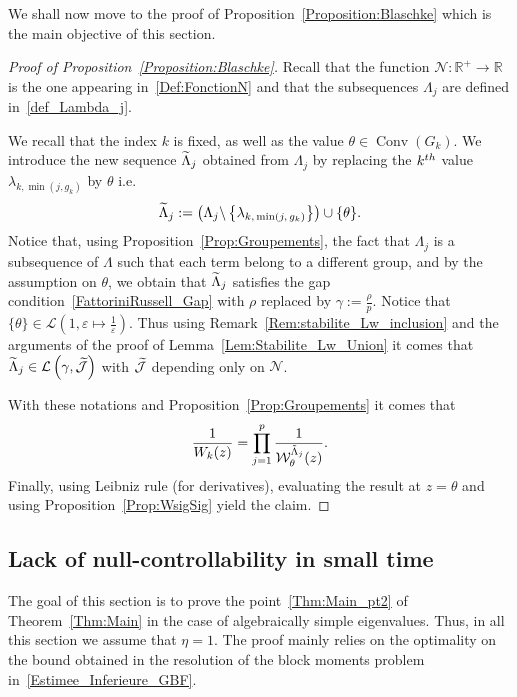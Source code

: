 \documentclass[11pt]{article}
\theoremstyle{definition}
\numberwithin{equation}{section}
\numberwithin{figure}{section}
\numberwithin{table}{section}
\DeclareMathOperator{\Conv}{Conv}
\newcommand{\n}{g}
\newcommand{\LL}{\mathcal{L}}
\newcommand{\R}{\mathbb{R}}
\let\oldtilde\tilde
\renewcommand*{\tilde}[1]{\mathchoice{\widetilde{#1}}{\widetilde{#1}}{\oldtilde{#1}}{\oldtilde{#1}}}\let\oldexists\exists
\renewcommand*{\exists}{\mathrel{\oldexists}}
\begin{document}
We shall now move to the proof of Proposition~\ref{Proposition:Blaschke} which is the main objective of this section.
\begin{proof}[Proof of Proposition~\ref{Proposition:Blaschke}]
Recall that the function $\mathcal{N} : \R^+ \to \R$ is the one appearing in~\eqref{Def:FonctionN} and that the subsequences $\Lambda_j$ are defined in~\eqref{def_Lambda_j}.

We recall that the index $k$ is fixed, as well as the value $\theta\in \Conv(G_k)$. We introduce the new sequence $\tilde{\Lambda}_j$ obtained from $\Lambda_j$ by replacing the $k^{\rm th}$ value $\lambda_{k,\min(j,\n_k)}$ by $\theta$ i.e.
\[
\tilde{\Lambda}_j := \left(\Lambda_j \backslash \left\{ \lambda_{k,\,\min(j,\,\n_k)} \right\} \right) \cup \{ \theta \}.
\]
Notice that, using Proposition~\ref{Prop:Groupements}, the fact that $\Lambda_j$ is a subsequence of $\Lambda$ such that each term belong to a different group, and by the assumption on $\theta$, we obtain that $\tilde{\Lambda}_j$ satisfies the gap condition~\eqref{FattoriniRussell_Gap} with $\rho$ replaced by $\gamma:=\frac{\rho}{p}$. Notice that $\{ \theta \} \in \LL \left(1, \varepsilon \mapsto \frac{1}{\varepsilon} \right)$. Thus using Remark~\ref{Rem:stabilite_Lw_inclusion} and the arguments of the proof of Lemma~\ref{Lem:Stabilite_Lw_Union} it comes that $\tilde{\Lambda}_j \in \mathcal{L}\left(\gamma,\tilde{\mathcal{J}}\right)$ with $\tilde{\mathcal{J}}$ depending only on $\mathcal{N}$.


With these notations and Proposition~\ref{Prop:Groupements} it comes that
\[
\frac{1}{W_k(z)} = \prod_{j=1}^p \frac{1}{\mathcal{W}^{\tilde{\Lambda}_j}_{\theta} (z)}.
\]
Finally, using Leibniz rule (for derivatives), evaluating the result at $z=\theta$ and using Proposition~\ref{Prop:WsigSig} yield the claim.
\end{proof}



\subsection{Lack of null-controllability in small time}\label{Sec:NonControlabilite}

The goal of this section is to prove the point~\eqref{Thm:Main_pt2} of Theorem~\ref{Thm:Main} in the case of algebraically simple eigenvalues. Thus, in all this section we assume that $\eta=1$. The proof mainly relies on the optimality on the bound obtained in the resolution of the block moments problem in~\eqref{Estimee_Inferieure_GBF}.
\end{document}
